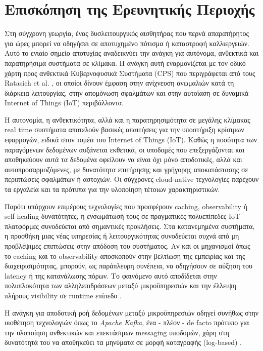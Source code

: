 \chapter{Επισκόπηση της Ερευνητικής Περιοχής}

Στη σύγχρονη γεωργία, ένας δυσλειτουργικός αισθητήρας που περνά απαρατήρητος για ώρες μπορεί να οδηγήσει σε αποτυχημένο πότισμα ή καταστροφή καλλιεργειών. Αυτό το ενιαίο σημείο αποτυχίας αναδεικνύει την ανάγκη για αυτόνομα, ανθεκτικά και παρατηρήσιμα συστήματα σε κλίμακα. Η ανάγκη αυτή εναρμονίζεται με τον οδικό χάρτη προς ανθεκτικά Κυβερνοφυσικά Συστήματα (CPS) που περιγράφεται από τους Ratasich et al. \cite{iotcps}, οι οποίοι δίνουν έμφαση στην ανίχνευση ανωμαλιών κατά τη διάρκεια λειτουργίας, στην απομόνωση σφαλμάτων και στην αυτοΐαση σε δυναμικά Internet of Things (IoT) περιβάλλοντα.

Η αυτονομία, η ανθεκτικότητα, αλλά και η παρατηρησιμότητα σε μεγάλης κλίμακας real time συστήματα αποτελούν βασικές απαιτήσεις για την υποστήριξη κρίσιμων εφαρμογών, ειδικά στον τομέα του Internet of Things (IoT). Καθώς η ποσότητα των παραγόμενων δεδομένων αυξάνεται εκθετικά, οι υποδομές που επεξεργάζονται και αποθηκεύουν αυτά τα δεδομένα οφείλουν να είναι όχι μόνο αποδοτικές, αλλά και αυτοπροσαρμοζόμενες, με δυνατότητα επιτήρησης και γρήγορης αποκατάστασης σε περιπτώσεις σφαλμάτων ή αστοχιών. Οι σύγχρονες cloud-native τεχνολογίες παρέχουν τα εργαλεία και τα πρότυπα για την υλοποίηση τέτοιων χαρακτηριστικών.

Παρότι υπάρχουν επιμέρους τεχνολογίες που προσφέρουν caching, observability ή self-healing δυνατότητες, η ενσωμάτωσή τους σε πραγματικές πολυεπίπεδες IoT πλατφόρμες συνοδεύεται από σημαντικές προκλήσεις. Στα κατανεμημένα συστήματα, η προσθήκη μιας νέας υπηρεσίας ή λειτουργικότητας συνοδεύεται συχνά από μη προβλέψιμες επιπτώσεις στην απόδοση του συστήματος. Αν και οι μηχανισμοί όπως το caching και το observability αποσκοπούν στην βελτίωση της εμπειρίας και της διαχειρισιμότητας, μπορούν, ως παράπλευρη συνέπεια, να οδηγήσουν σε αύξηση του latency ή της κατανάλωσης πόρων. Το φαινόμενο αυτό αποδίδεται στην πολυπλοκότητα των αλληλεπιδράσεων μεταξύ μικροϋπηρεσιών και την έλλειψη πλήρους visibility σε runtime επίπεδο \cite{kleppmanndda}.

Η ανάγκη για αποδοτική ροή δεδομένων μεταξύ μικροϋπηρεσιών οδηγεί συνήθως στην υιοθέτηση τεχνολογιών όπως το \textit{Apache Kafka}, ένα - πλέον - de facto πρότυπο για την υλοποίηση ανθεκτικών και επεκτάσιμων messaging υποδομών, χάρη στη δυνατότητά του να αποθηκεύει τα μηνύματα σε μορφή καταγραφής (log-based) \cite{kafkabdd}.

